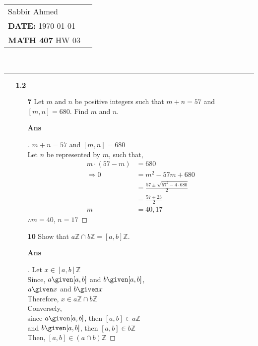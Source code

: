 \documentclass[paper=usletter, fontsize=12pt]{article}
\newcommand{\documentinfo}[5]{
    \begin{centering}
        \parbox{2in}{
        \begin{spacing}{1}
            \begin{flushleft}
                \begin{tabular}{l l}
                    #1 \\
                    #2 \\
                    #3 \\
                \end{tabular}\\
                \rule{\textwidth}{1pt}
            \end{flushleft}
        \end{spacing}
        }
    \end{centering}
}
\begin{document}
    \documentinfo{Sabbir Ahmed}{\textbf{DATE:} \today}{\textbf{MATH 407} HW 03}
    \vspace{-0.2in}

    \begin{itemize}

        \item[\textbf{1.2}]

        \begin{itemize}

            \item[\textbf{7}] Let $m$ and $n$ be positive integers such that $m
            + n = 57$ and $[m, n] = 680$. Find $m$ and $n$.
            \item[\textbf{Ans}]
            \begin{proof}[\unskip\nopunct]
                $m + n = 57$ and $[m, n] = 680$\\
                Let $n$ be represented by $m$, such that,
                \begingroup
                \addtolength{\jot}{1em}
                \begin{align*}
                    m \cdot (57 - m) & = 680\\
                    \Rightarrow 0 & = m^2 - 57m + 680\\
                    & = \frac{57 \pm \sqrt{57^2-4\cdot 680}}{2}\\
                    & = \frac{57 \pm 23}{2}\\
                    m & = 40, 17
                \end{align*}
                \endgroup
                $\therefore m = 40$, $n = 17$ \qedhere
            \end{proof}
            \vspace{0.2in}

            \item[\textbf{10}] Show that $a\mathbb{Z} \cap b\mathbb{Z} =
            [a,b]\mathbb{Z}$.
            \item[\textbf{Ans}]
            \begin{proof}[\unskip\nopunct]
                Let $x \in [a,b]\mathbb{Z}$\\
                Since, $a \given [a,b]$ and $b \given [a,b]$,\\
                $a \given x$ and $b \given x$\\
                Therefore, $x \in a\mathbb{Z} \cap b\mathbb{Z}$\\

                Conversely,\\
                since $a \given [a,b]$, then $[a,b] \in a\mathbb{Z}$\\
                and $b \given [a,b]$, then $[a,b] \in b\mathbb{Z}$\\
                Then, $[a,b] \in (a \cap b)\mathbb{Z}$


\end{proof}
\end{itemize}
\end{itemize}
\end{document}
